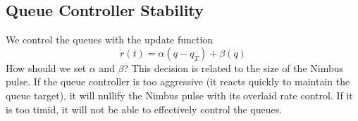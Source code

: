\begin{appendix}
\section{Queue Controller Stability}\label{app:derive-ab}



We control the queues with the update function 
\begin{equation} 
    \dot{r}(t) = \alpha (q - q_T) + \beta (\dot{q})
\end{equation}
%
How should we set $\alpha$ and $\beta$? This decision is related to the size of the Nimbus pulse. 
If the queue controller is too aggressive (\ie it reacts quickly to maintain the queue target), it will nullify the Nimbus pulse with its overlaid rate control.
If it is too timid, it will not be able to effectively control the queues.


\end{appendix}
